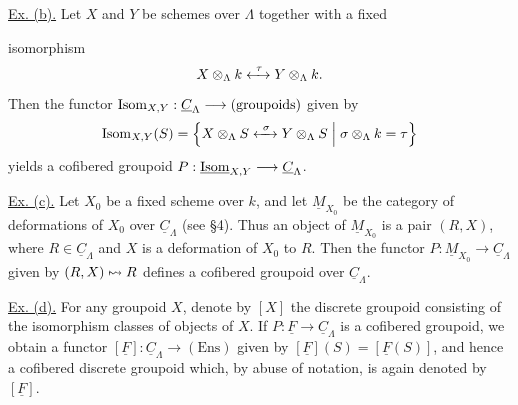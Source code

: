 \underline{Ex. (b).} Let $X$ and $Y$ be schemes over $\Lambda$
together with a fixed


isomorphism
\[
 X\otimes_\Lambda k\xleftrightarrow{\ \tau\ }Y\otimes_\Lambda k.
\]
Then the functor
$\Isom_{X,Y}:\underline C_\Lambda\longrightarrow(\text{groupoids})$
given by
\[
 \operatorname{Isom}_{X,Y}(S)=
 \left\{X\otimes_\Lambda S\xleftrightarrow{\ \sigma\ }
 Y\otimes_\Lambda S\;\middle|\;
 \sigma\otimes_\Lambda k=\tau\right\}
\]
yields a cofibered groupoid
$P:\underline{\Isom}_{X,Y}\longrightarrow\underline C_\Lambda$.

\underline{Ex. (c).} Let $X_0$ be a fixed scheme over $k$, and let
$\underline M_{X_0}$ be the category of deformations of $X_0$ over
$\underline C_\Lambda$ (see \S4). Thus an object of
$\underline M_{X_0}$ is a pair $(R,X)$, where
$R\in\underline C_\Lambda$ and $X$ is a deformation of $X_0$ to $R$.
Then the functor
$P:\underline M_{X_0}\longrightarrow\underline C_\Lambda$ given by
$(R,X)\mathrel{\mapstochar\rightsquigarrow} R$ defines a cofibered groupoid over
$\underline C_\Lambda$.

\underline{Ex. (d).} For any groupoid $X$, denote by $[X]$ the
discrete groupoid consisting of the isomorphism classes of objects of
$X$. If $P:\underline F\longrightarrow\underline C_\Lambda$ is a
cofibered groupoid, we obtain a functor
$[\underline F]:\underline C_\Lambda\longrightarrow(\mathrm{Ens})$
given by $[\underline F](S)=[\underline F(S)]$, and hence a cofibered
discrete groupoid which, by abuse of notation, is again denoted by
$[\underline F]$.

